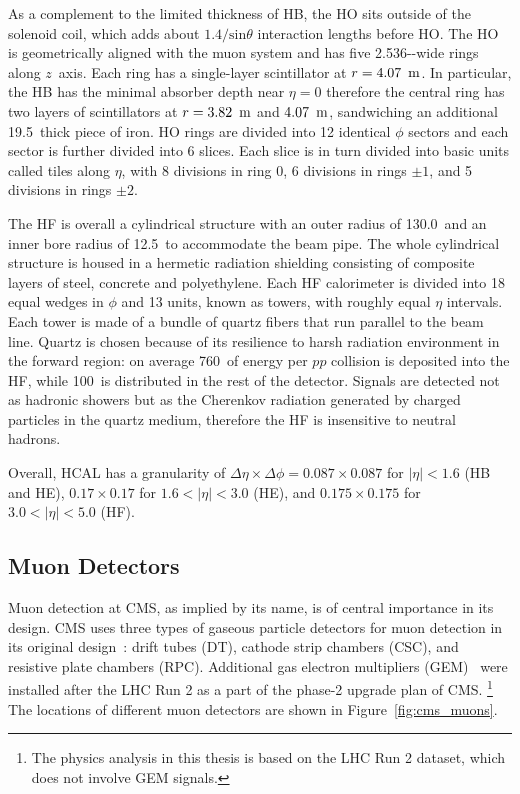 As a complement to the limited thickness of HB, 
the HO sits outside of the solenoid coil, which adds about $1.4 / \text{sin}\theta$ interaction lengths before HO.
The HO is geometrically aligned with the muon system and has five 2.536-\meter-wide rings along $z$~axis.
Each ring has a single-layer scintillator at $r = 4.07~\meter$.
In particular, the HB has the minimal absorber depth near $\eta = 0$ therefore the central ring has 
two layers of scintillators at $r = 3.82~\meter$ and $4.07~\meter$, sandwiching an additional 19.5~\cm thick piece of iron.
HO rings are divided into 12 identical $\phi$ sectors and each sector is further divided into 6 slices.
Each slice is in turn divided into basic units called tiles along $\eta$, with 8 divisions in ring 0, 6 divisions in rings $\pm 1$, and 5 divisions in rings $\pm 2$. 

The HF is overall a cylindrical structure with an outer radius of 130.0~\cm and an inner bore radius of 12.5~\cm to accommodate the beam pipe.
The whole cylindrical structure is housed in a hermetic radiation shielding consisting of composite layers of steel, concrete and polyethylene. 
Each HF calorimeter is divided into 18 equal wedges in $\phi$ and 13 units, known as towers, with roughly equal $\eta$ intervals. 
Each tower is made of a bundle of quartz fibers that run parallel to the beam line.
Quartz is chosen because of its resilience to harsh radiation environment in the forward region:
on average 760~\GeV of energy per $pp$ collision is deposited into the HF, while 100~\GeV is distributed in the rest of the detector.
Signals are detected not as hadronic showers but as the Cherenkov radiation generated by charged particles in the quartz medium, 
therefore the HF is insensitive to neutral hadrons.

Overall, HCAL has a granularity of $\Delta\eta \times \Delta\phi = 0.087 \times 0.087$ for $|\eta| < 1.6$ (HB and HE), 
$0.17 \times 0.17$ for $1.6 < |\eta| < 3.0$ (HE), and $0.175 \times 0.175$ for $3.0 < |\eta| < 5.0$ (HF).


\subsection{Muon Detectors}\label{sec:muon_chambers}

Muon detection at CMS, as implied by its name, is of central importance in its design.
CMS uses three types of gaseous particle detectors for muon detection in its original design~\cite{Collaboration_2008, collaboration_2013}:
drift tubes (DT), cathode strip chambers (CSC), and resistive plate chambers (RPC).
Additional gas electron multipliers (GEM)~\cite{Colaleo:2021453} were installed after the LHC Run 2 as a part of the phase-2 upgrade plan of CMS.
\footnote{The physics analysis in this thesis is based on the LHC Run 2 dataset, which does not involve GEM signals.} 
The locations of different muon detectors are shown in Figure~\ref{fig:cms_muons}.

